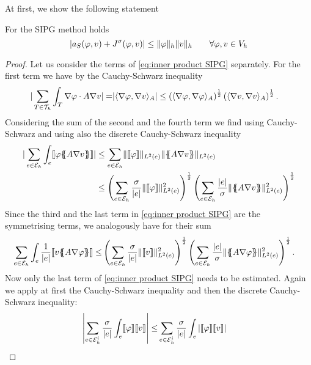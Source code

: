 At first, we show the following statement
\begin{lemma}\label{la: SIPG continuous}
	For the SIPG method holds
	\[
		|a_S(\varphi, v) + J^\sigma(\varphi,v)| \leq \lVert \varphi \rVert_{h} \lVert v \rVert_{h} \qquad \forall \varphi,v \in V_h
	\]
\end{lemma}
\begin{proof}
Let us consider the terms of \eqref{eq:inner product SIPG} separately.
For the first term we have by the Cauchy-Schwarz inequality
\begin{align}
	|\sum\limits_{T \in \mathcal{T}_h} \int_T \nabla \varphi \cdot A \nabla v| =& |  \langle \nabla \varphi, \nabla v \rangle _A | \leq \left( {  \langle \nabla \varphi, \nabla \varphi \rangle _A}\right)^{\frac 1 2 } \left( {  \langle \nabla v, \nabla v \rangle _A}\right)^{\frac 1 2 }. \label{eq: CS estimate 0}
\end{align}
Considering the sum of the second and the fourth term we find using Cauchy-Schwarz and using also the discrete Cauchy-Schwarz inequality
\begin{align}
	|\sum\limits_{e \in \edges}\int_{e} \jump {\varphi \average{A \nabla v} }| &\leq
	\sum\limits_{e \in \edges}  \LTwonormE{\jump {\varphi}} \LTwonormE {\average{A \nabla v}} \nonumber \\
	& \leq
		\left( \sum\limits_{e \in \edges} \frac {\sigma}{|e|} \LTwonormE{\jump {\varphi}}^2 \right)^{\frac 1 2}
		\left( \sum\limits_{e \in \edges} \frac {|e|} \sigma \LTwonormE{\average{A \nabla v}}^2 \right)^{\frac 1 2} \label{eq: CS estimate}
\end{align}
Since the third and the last term in \eqref{eq:inner product SIPG} are the symmetrising terms, we analogously have for their sum
\begin{align}
\sum\limits_{e \in \edges}\int_{e} \frac 1 {|e|}\jump {v \average{A \nabla \varphi} } \leq&
			\left( \sum\limits_{e \in \edges} \frac {\sigma}{|e|}\LTwonormE{\jump {v}}^2 \right)^{\frac 1 2}
			\left( \sum\limits_{e \in \edges} \frac {|e|} \sigma \LTwonormE{\average{A \nabla \varphi}}^2 \right)^{\frac 1 2}.\label{eq: CS estimate2}
\end{align}
Now only the last term of \ref{eq:inner product SIPG} needs to be estimated. Again we apply at first the Cauchy-Schwarz inequality and then the discrete Cauchy-Schwarz inequality:
\begin{align}
\singleNorm {\sum_{e \in \edgesi} \frac \sigma {|e|} \int_e \jump \varphi \jump v }
\leq& \sum_{e \in \edgesi} \frac \sigma  {|e|} \int_e \singleNorm {\jump \varphi \jump v }

\end{align}
\end{proof}
